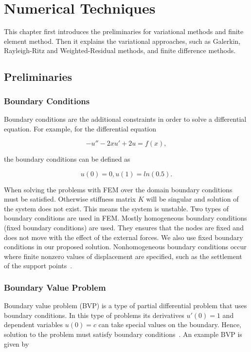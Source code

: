 \chapter{Numerical Techniques}
\label{chapter3}

This chapter first introduces the preliminaries for variational methods and finite element method. Then it explains
the variational approaches, such as Galerkin, Rayleigh-Ritz and Weighted-Residual methods, and finite difference methods.

\section{Preliminaries}

\subsection{Boundary Conditions}

Boundary conditions are the additional constraints in order to solve a differential equation. For example,
for the differential equation

\begin{equation}
-u''-2xu'+2u = f(x),
\label{eqn:2-01}
\end{equation}

\noindent the boundary conditions can be defined as

\begin{equation}
u(0) = 0, u(1) = ln(0.5).
\label{eqn:2-02}
\end{equation}

When solving the problems with FEM over the domain boundary conditions must be satisfied. Otherwise stiffness matrix $K$ will be singular and solution of the system does not exist. This means the system is unstable. Two types of boundary conditions are used in FEM. Mostly homogeneous boundary conditions (fixed boundary conditions) are used. They ensures that the nodes are fixed and does not move with the effect of the external forces. We also use fixed boundary conditions in our proposed solution. Nonhomogeneous boundary conditions occur where finite nonzero values of displacement are specified, such as the settlement of the support points~\cite{Logan07}.

\subsection{Boundary Value Problem}

Boundary value problem (BVP) is a type of partial differential problem that uses boundary conditions. In this type of problems its derivatives $u'(0)=1$ and dependent variables $u(0)=c$ can take special values on the boundary. Hence, solution to the problem must satisfy boundary conditions~\cite{Reddy93}. An example BVP is given by

